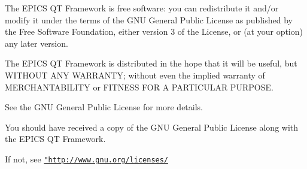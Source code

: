 The EPICS QT Framework is free software: you can redistribute it and/or modify it under the terms of the GNU General Public License as published by the Free Software Foundation, either version 3 of the License, or (at your option) any later version.\par
 The EPICS QT Framework is distributed in the hope that it will be useful, but WITHOUT ANY WARRANTY; without even the implied warranty of MERCHANTABILITY or FITNESS FOR A PARTICULAR PURPOSE.\par
 See the GNU General Public License for more details.

You should have received a copy of the GNU General Public License along with the EPICS QT Framework.\par
 If not, see \href{http://www.gnu.org/licenses/}{\tt "http://www.gnu.org/licenses/} 
